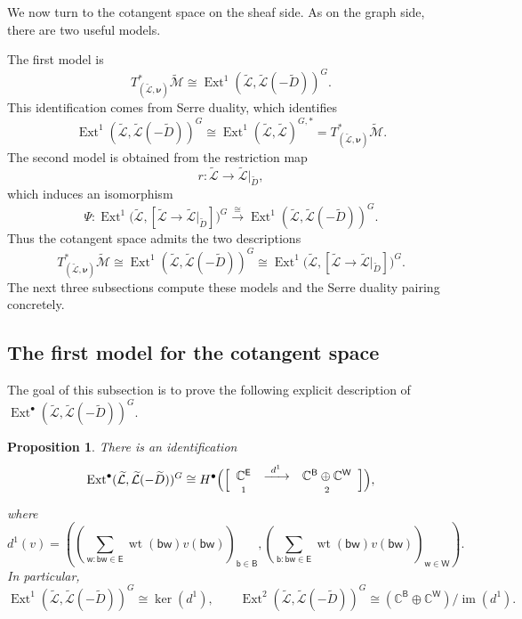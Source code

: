\documentclass[dvipsnames,11pt]{article}
\newtheorem{proposition}[theorem]{Proposition}
\theoremstyle{definition}
\newcommand{\wt}{\operatorname{wt}}
\newcommand{\C}{{\mathbb C}}
\def\B{\mathsf B}
\def\W{\mathsf W}
\def\w{\mathsf w}
\def\b{\mathsf b}
\def\E{\mathsf E}
\def\Ext{\operatorname{Ext}}
\def\Ext{\operatorname{Ext}}
\begin{document}
We now turn to the cotangent space on the sheaf side. As on the graph side, there are two useful models.

The first model is
\[
T^*_{(\widetilde{\mathcal L},\bm\nu)}\widetilde{\mathcal M}
\cong
\Ext^1(\widetilde{\mathcal L},\widetilde{\mathcal L}(-\widetilde D))^G.
\]
This identification comes from Serre duality, which identifies
\[
\Ext^1(\widetilde{\mathcal L},\widetilde{\mathcal L}(-\widetilde D))^G
\cong
\Ext^1(\widetilde{\mathcal L},\widetilde{\mathcal L})^{G,*}
=
T^*_{(\widetilde{\mathcal L},\bm\nu)}\widetilde{\mathcal M}.
\]
The second model is obtained from the restriction map
\[
r:\widetilde{\mathcal L}\to \widetilde{\mathcal L}|_{\widetilde D},
\]
which induces an isomorphism
\[
\Psi:
\Ext^1\!\bigl(\widetilde{\mathcal L},
[\widetilde{\mathcal L}\to \widetilde{\mathcal L}|_{\widetilde D}]\bigr)^G
\xrightarrow{\ \cong\ }
\Ext^1(\widetilde{\mathcal L},\widetilde{\mathcal L}(-\widetilde D))^G.
\]
Thus the cotangent space admits the two descriptions
\[
T^*_{(\widetilde{\mathcal L},\bm\nu)}\widetilde{\mathcal M}
\cong
\Ext^1(\widetilde{\mathcal L},\widetilde{\mathcal L}(-\widetilde D))^G
\cong
\Ext^1\!\bigl(\widetilde{\mathcal L},
[\widetilde{\mathcal L}\to \widetilde{\mathcal L}|_{\widetilde D}]\bigr)^G.
\]
The next three subsections compute these models and the Serre duality pairing concretely.

\subsection{The first model for the cotangent space}\label{sec:ext2}

The goal of this subsection is to prove the following explicit description of
\(
\Ext^\bullet(\widetilde{\mathcal L},\widetilde{\mathcal L}(-\widetilde D))^G.
\)

\begin{proposition}\label{prop:repext2}
There is an identification
\begin{equation}\label{eq:chain_ext-d}
\Ext^\bullet(\widetilde{\mathcal L},\widetilde{\mathcal L}(-\widetilde D))^G
\cong
H^\bullet\Bigl(\Bigl[
\begin{array}{c c c}
\C^{\E} & \xrightarrow{\ d^1\ } & \C^{\B}\oplus \C^{\W}\\[-.4ex]
{\scriptstyle 1} && {\scriptstyle 2}
\end{array}
\Bigr]\Bigr),
\end{equation}
where
\[
d^1(v)
=
\left(
\left(\sum_{\w:\b\w\in\E}\wt(\b\w)v(\b\w)\right)_{\b\in\B},
\left(\sum_{\b:\b\w\in\E}\wt(\b\w)v(\b\w)\right)_{\w\in\W}
\right).
\]
In particular,
\[
\Ext^1(\widetilde{\mathcal L},\widetilde{\mathcal L}(-\widetilde D))^G
\cong
\ker(d^1), \qquad
\Ext^2(\widetilde{\mathcal L},\widetilde{\mathcal L}(-\widetilde D))^G
\cong
(\C^{\B}\oplus \C^{\W})/\operatorname{im}(d^1).
\]
\end{proposition}
\end{document}
